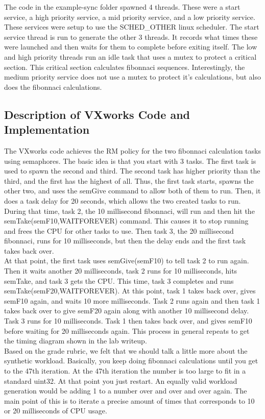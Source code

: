 \documentclass{article}
\begin{document}
The code in the example-sync folder spawned 4 threads. These were a start service, a high priority service, a mid priority service, and a low priority service. These services were setup to use the SCHED\_OTHER linux scheduler. The start service thread is run to generate the other 3 threads. It records what times these were launched and then waits for them to complete before exiting itself. The low and high priority threads run an idle task that uses a mutex to protect a critical section. This
critical section calculates fibonnaci sequences. Interestingly, the medium priority service does not use a mutex to protect it's calculations, but also does the fibonnaci calculations.

\subsection*{Description of VXworks Code and Implementation}
The VXworks code achieves the RM policy for the two fibonnaci calculation tasks using semaphores. The basic idea is that you start with 3 tasks. The first task is used to spawn the second and third. The second task has higher priority than the third, and the first has the highest of all. Thus, the first task starts, spawns the other two, and uses the semGive command to allow both of them to run. Then, it does a task delay for 20 seconds, which allows the two created tasks to run.
During that time, task 2, the 10 millisecond fibonnaci, will run and then hit the semTake(semF10,WAITFOREVER) command. This causes it to stop running and frees the CPU for other tasks to use. Then task 3, the 20 millisecond fibonnaci, runs for 10 milliseconds, but then the delay ends and the first task takes back over.\\

At that point, the first task uses semGive(semF10) to tell task 2 to run again. Then it waits another 20 milliseconds, task 2 runs for 10 milliseconds, hits semTake, and task 3 gets the CPU. This time, task 3 completes and runs semTake(semF20,WAITFOREVER). At this point, task 1 takes back over, gives semF10 again, and waits 10 more milliseconds. Task 2 runs again and then task 1 takes back over to give semF20 again along with another 10 millisecond delay. Task 3 runs for 10 milliseconds.
Task 1 then takes back over, and gives semF10 before waiting for 20 milliseconds again. This process in general repeats to get the timing diagram shown in the lab writeup.\\

Based on the grade rubric, we felt that we should talk a little more about the synthetic workload. Basically, you keep doing fibonnaci calculations until you get to the 47th iteration. At the 47th iteration the number is too large to fit in a standard uint32. At that point you just restart. An equally valid workload generation would be adding 1 to a number over and over and over again. The main point of this is to iterate a precise amount of times that corresponds to 10 or 20
milliseconds of CPU usage.\\
\end{document}
